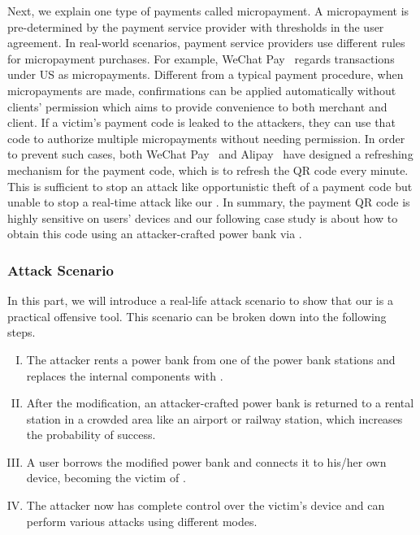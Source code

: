 Next, we explain one type of payments called micropayment. A micropayment is pre-determined by the payment
service provider with thresholds in the user agreement. In real-world scenarios, payment service providers use different rules
for micropayment purchases. For example, WeChat
Pay~\cite{Wechat-pay} regards transactions under US as
micropayments.  Different from a typical payment procedure, when micropayments
are made, confirmations can be applied automatically without clients'
permission which aims to provide convenience to both merchant and client.  If a
victim's payment code is leaked to the attackers, they can use that code to
authorize multiple micropayments without needing permission.  In order to prevent such
cases, both WeChat Pay~\cite{Wechat-pay} and Alipay~\cite{AliPay} have designed a refreshing mechanism for the
payment code, which is to refresh the QR code every minute. This is sufficient
to stop an attack like opportunistic theft of a payment code but unable to stop a real-time attack like our
\tool.  In summary, the payment QR code is highly sensitive on users' devices
and our following case study is about how to obtain this code using an
attacker-crafted power bank via \tool.

\subsubsection{Attack Scenario}
\label{subsec:attack-scenario}

In this part, we will introduce a real-life attack scenario to show that our
\tool is a practical offensive tool.  This scenario can be broken down into the
following steps.

\begin{enumerate}[I. ]
	\item The attacker rents a power bank from one of the power bank stations and replaces the internal components with \tool.
	\item After the modification, an attacker-crafted power bank is returned to a rental station in a crowded area like an airport or railway station, which increases the probability of success.
	\item A user borrows the modified power bank and connects it to his/her own device, becoming the victim of \tool.
	\item The attacker now has complete control over the victim's device and can perform various attacks using different modes.
\end{enumerate}


